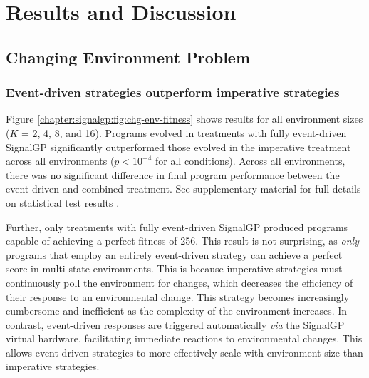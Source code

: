 \section{Results and Discussion}
\label{chapter:signalgp:sec:results-and-discussion}

\subsection{Changing Environment Problem}




\subsubsection{Event-driven strategies outperform imperative strategies}

Figure \ref{chapter:signalgp:fig:chg-env-fitness} shows results for all environment sizes ($K$ = 2, 4, 8, and 16). 
Programs evolved in treatments with fully event-driven SignalGP significantly outperformed those evolved in the imperative treatment across all environments ($p<10^{-4}$ for all conditions). 
Across all environments, there was no significant difference in final program performance between the event-driven and combined treatment. 
See supplementary material for full details on statistical test results \citep{signalgp_supplement_2018}. 

Further, only treatments with fully event-driven SignalGP produced programs capable of achieving a perfect fitness of 256. 
This result is not surprising, as \textit{only} programs that employ an entirely event-driven strategy can achieve a perfect score in multi-state environments. 
This is because imperative strategies must continuously poll the environment for changes, which decreases the efficiency of their response to an environmental change.
This strategy becomes increasingly cumbersome and inefficient as the complexity of the environment increases. 
In contrast, event-driven responses are triggered automatically \textit{via} the SignalGP virtual hardware, facilitating immediate reactions to environmental changes.
This allows event-driven strategies to more effectively scale with environment size than imperative strategies. 

